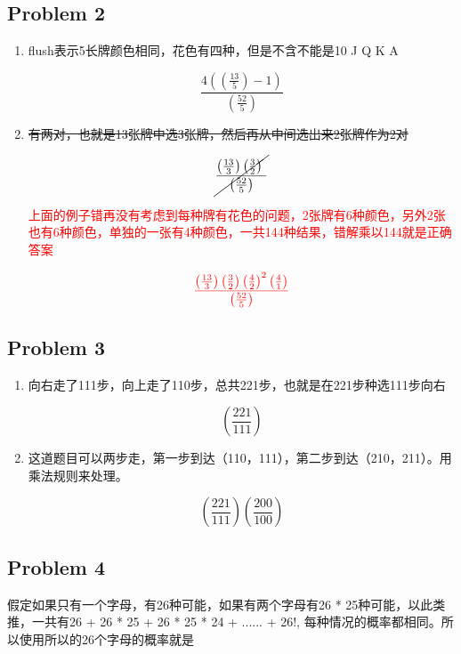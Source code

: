 \documentclass{article}
\begin{document}
\subsection*{Problem 2}
\begin{enumerate}[label=(\alph*)]
\item flush表示5长牌颜色相同，花色有四种，但是不含不能是10 J Q K A

$$ \frac{4\left( \left( \frac{13}{5} \right)  -1\right)  }{\left( \frac{52}{5} \right)  } $$

\item \sout{有两对，也就是13张牌中选3张牌，然后再从中间选出来2张牌作为2对}


$$
\cancel{
\frac{\left( \frac{13}{3} \right)  \left( \frac{3}{2} \right)  \  }{\left( \frac{52}{5} \right)  } 
}
$$


\textcolor{red}{上面的例子错再没有考虑到每种牌有花色的问题，2张牌有6种颜色，另外2张也有6种颜色，单独的一张有4种颜色，一共144种结果，错解乘以144就是正确答案}

$$
\textcolor{red} {
\frac{\left( \frac{13}{3} \right)  \left( \frac{3}{2} \right)  \left( \frac{4}{2} \right)^{2}  \left( \frac{4}{1} \right)  }{\left( \frac{52}{5} \right)  } 
}
$$

\end{enumerate}
\clearpage



\subsection*{Problem 3}

\begin{enumerate}[label=(\alph*)]
\item 向右走了111步，向上走了110步，总共221步，也就是在221步种选111步向右

$$ 
\left( \frac{221}{111} \right)  
$$

\item 这道题目可以两步走，第一步到达（110，111），第二步到达（210，211）。用乘法规则来处理。

$$
\left( \frac{221}{111} \right)  \left( \frac{200}{100} \right)  
$$
\end{enumerate}

\clearpage

\subsection*{Problem 4}
假定如果只有一个字母，有26种可能，如果有两个字母有26 * 25种可能，以此类推，一共有26 + 26 * 25 + 26 * 25 * 24 + ...... + 26!, 每种情况的概率都相同。所以使用所以的26个字母的概率就是
\end{document}

